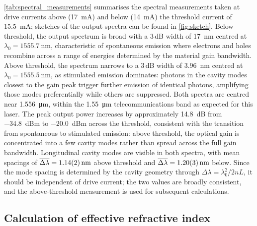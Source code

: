 \documentclass[a4paper, 10pt]{article}
\begin{document}
\autoref{tab:spectral_measurements} summarises the spectral measurements taken at drive currents above (\SI{17}{\milli\ampere}) and below (\SI{14}{\milli\ampere}) the threshold current of \SI{15.5}{\milli\ampere}; sketches of the output spectra can be found in \autoref{fig:sketch}. Below threshold, the output spectrum is broad with a 3\,dB width of \SI{17}{\nano\metre} centred at $\lambda_0 = \SI{1555.7}{\nano\metre}$, characteristic of spontaneous emission where electrons and holes recombine across a range of energies determined by the material gain bandwidth. Above threshold, the spectrum narrows to a 3\,dB width of \SI{3.96}{\nano\metre} centred at $\lambda_0 = \SI{1555.5}{\nano\metre}$, as stimulated emission dominates: photons in the cavity modes closest to the gain peak trigger further emission of identical photons, amplifying those modes preferentially while others are suppressed. Both spectra are centred near \SI{1.556}{\micro\metre}, within the \SI{1.55}{\micro\metre} telecommunications band as expected for this laser. The peak output power increases by approximately \SI{14.8}{\deci\bel} from \SI{-34.8}{dBm} to \SI{-20.0}{dBm} across the threshold, consistent with the transition from spontaneous to stimulated emission: above threshold, the optical gain is concentrated into a few cavity modes rather than spread across the full gain bandwidth. Longitudinal cavity modes are visible in both spectra, with mean spacings of $\overline{\Delta\lambda} = \SI{1.14 +- 0.02}{\nano\metre}$ above threshold and $\overline{\Delta\lambda} = \SI{1.20 +- 0.03}{\nano\metre}$ below. Since the mode spacing is determined by the cavity geometry through $\Delta\lambda = \lambda_0^2 / 2nL$, it should be independent of drive current; the two values are broadly consistent, and the above-threshold measurement is used for subsequent calculations.

\subsection{Calculation of effective refractive index}
\end{document}
